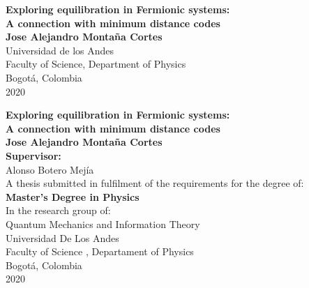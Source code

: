\begin{center}
\begin{figure}
\centering%
%
\end{figure}
\thispagestyle{empty} \vspace*{0.0cm} \textbf{\huge
 Exploring equilibration in Fermionic systems: \\ A connection with minimum distance codes} \\[4.0cm]
\Large\textbf{Jose Alejandro Montaña Cortes}\\[5.5cm]
\small Universidad de los Andes\\
Faculty of Science, Department of Physics\\
Bogotá, Colombia\\
2020\\
\end{center}

\newpage{\pagestyle{empty}\cleardoublepage}

\newpage
\begin{center}
\thispagestyle{empty} \vspace*{0cm} \textbf{\huge Exploring equilibration in Fermionic systems: \\ A connection with minimum distance codes } \\[1.8cm]
\Large\textbf{Jose Alejandro Montaña Cortes}\\[2.5cm]
\textbf{Supervisor:}\\[1.0cm]
Alonso Botero Mejía\\[2.0cm]
\small A thesis submitted in fulfilment of the requirements for the degree of:\\
\textbf{Master's Degree in Physics}\\
In the research group of:\\
Quantum Mechanics and Information Theory\\[2.0cm]
Universidad De Los Andes\\
Faculty of Science , Departament of Physics\\
Bogotá, Colombia\\
2020\\



\end{center}

